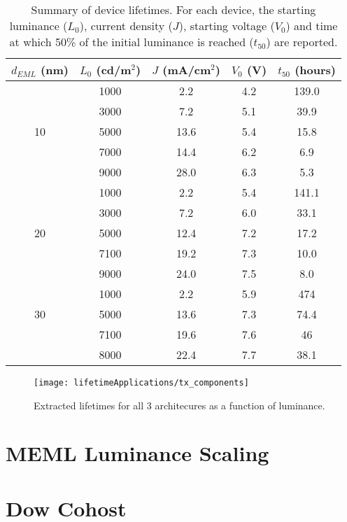 \documentclass[../thesis.tex]{subfiles}
\begin{document}
\begin{table}[ht]
\centering
\begin{tabular}{c|c|c|c|c}
$d_{EML}$ (nm) & $L_0$ (cd/m$^2$) & $J$ (mA/cm$^2$) & $V_0$ (V) & $t_{50}$ (hours) \\
\hline
& 1000 & 2.2 & 4.2 & 139.0 \\
& 3000 & 7.2 & 5.1 & 39.9 \\
10 & 5000 & 13.6 & 5.4 & 15.8 \\
& 7000 & 14.4 & 6.2 & 6.9 \\
& 9000 & 28.0 &  6.3 & 5.3 \\
\hline
& 1000 & 2.2 & 5.4 & 141.1 \\
& 3000 & 7.2 & 6.0 & 33.1 \\
20 & 5000 & 12.4 & 7.2 & 17.2 \\
& 7100 & 19.2 & 7.3 & 10.0 \\
& 9000 & 24.0 &  7.5 & 8.0 \\
\hline
& 1000 & 2.2 & 5.9 & 474 \\
30 & 5000 & 13.6 & 7.3 & 74.4\\
& 7100 & 19.6 & 7.6 & 46 \\
& 8000 & 22.4 &  7.7 & 38.1 \\

\end{tabular}
\caption{Summary of device lifetimes.  For each device, the starting luminance ($L_0$), current density ($J$), starting voltage ($V_0$) and time at which 50\% of the initial luminance is reached ($t_{50}$) are reported.}
\label{tab:lifetime_summary}
\end{table}

\begin{figure}[ht]
\centering
\texttt{[image: lifetimeApplications/tx\_components]}
\caption{Extracted lifetimes for all 3 architecures as a function of luminance.}
\label{fig:tx_components}
\end{figure}

\section{MEML Luminance Scaling}


\section{Dow Cohost}



\end{document}
